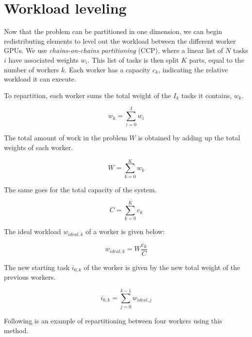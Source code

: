 \section{Workload leveling} \label{section:load_balancing:workload_leveling}
Now that the problem can be partitioned in one dimension, we can begin redistributing elements to
level out the workload between the different worker GPUs. We use \textit{chains-on-chains
partitioning} (CCP), where a linear list of $N$ tasks $i$ have associated weights $w_i$. This list
of tasks is then split $K$ parts, equal to the number of workers $k$. Each worker has a capacity
$c_k$, indicating the relative workload it can execute.

To repartition, each worker sums the total weight of the $I_k$ tasks it contains, $w_k$.

\begin{equation}
	w_k = \sum_{i = 0}^{I}w_i
\end{equation}

The total amount of work in the problem $W$ is obtained by adding up the total weights of each
worker.

\begin{equation}
	W = \sum_{k = 0}^{K}w_k
\end{equation}

The same goes for the total capacity of the system.

\begin{equation}
	C = \sum_{k = 0}^{K}c_k
\end{equation}

The ideal workload $w_{ideal,k}$ of a worker is given below:

\begin{equation}
	w_{ideal,k} = W \frac{c_k}{C}
\end{equation}

The new starting task $i_{0, k}$ of the worker is given by the new total weight of the previous
workers.

\begin{equation}
	i_{0, k} = \sum_{j = 0}^{k - 1}w_{ideal,j}
\end{equation}

Following is an example of repartitioning between four workers using this method.

